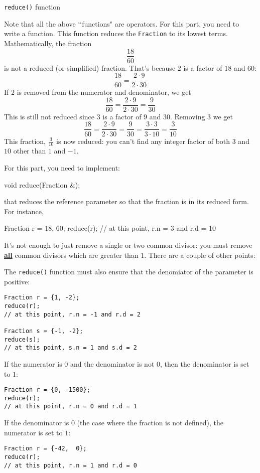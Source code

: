 \verb!reduce()! function

Note that all the above \lq\lq functions" are operators. For this part, you
need to write a function. This function reduces the \verb!Fraction! to its
lowest terms. Mathematically, the fraction
\[
\frac{18}{60}
\]
is not a reduced (or simplified) fraction. That's because $2$ is a factor of
$18$ and $60$:
\[
\frac{18}{60} = \frac{2 \cdot 9}{2 \cdot 30}
\]
If $2$ is removed from the numerator and denominator, we get
\[
\frac{18}{60}
= \frac{2 \cdot 9}{2 \cdot 30}
= \frac{9}{30}
\]
This is still not reduced since $3$ is a factor of $9$ and $30$. Removing $3$
we get
\[
\frac{18}{60}
= \frac{2 \cdot 9}{2 \cdot 30}
= \frac{9}{30}
= \frac{3 \cdot 3}{3 \cdot 10}
= \frac{3}{10}
\]
This fraction, $\frac{3}{10}$ is now reduced: you can't find any integer factor
of both $3$ and $10$ other than $1$ and $-1$.

For this part, you need to implement:
\begin{console}
void reduce(Fraction &);
\end{console}
that reduces the reference parameter so that the fraction is in its reduced
form. For instance,
\begin{console}
Fraction r = {18, 60};
reduce(r);
// at this point, r.n = 3 and r.d = 10
\end{console}

It's not enough to just remove a single or two common divisor: you must remove
\textbf{\underline{all}} common divisors which are greater than $1$. There are
a couple of other points:
\begin{itemize}
  \li The \verb!reduce()! function must also ensure that the denomiator of the
      parameter is positive:
\begin{Verbatim}[frame=single]
Fraction r = {1, -2};
reduce(r);
// at this point, r.n = -1 and r.d = 2

Fraction s = {-1, -2};
reduce(s);
// at this point, s.n = 1 and s.d = 2
\end{Verbatim}
  \li If the numerator is $0$ and the denominator is not $0$, then the
      denominator is set to $1$:
      \begin{Verbatim}[frame=single]
Fraction r = {0, -1500};
reduce(r);
// at this point, r.n = 0 and r.d = 1
      \end{Verbatim}
  \li If the denominator is $0$ (the case where the fraction is not defined),
      the numerator is set to $1$:
      \begin{Verbatim}[frame=single]
Fraction r = {-42,  0};
reduce(r);
// at this point, r.n = 1 and r.d = 0
      \end{Verbatim}
\end{itemize}

